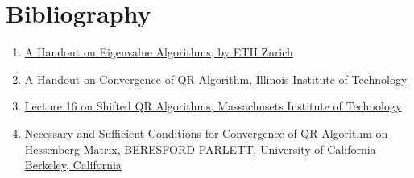 
\chapter{Bibliography} %

\label{Bibliography}


\begin{enumerate}
    \item \href{https://people.inf.ethz.ch/arbenz/ewp/Lnotes/chapter4.pdf}{A Handout on Eigenvalue Algorithms, by ETH Zurich}
    \item \href{https://www.math.iit.edu/~fass/477577_Chapter_11.pdf}{A Handout on Convergence of QR Algorithm, Illinois Institute of Technology}
    \item \href{https://dspace.mit.edu/bitstream/handle/1721.1/75282/18-335j-fall-2006/contents/lecture-notes/lec16.pdf}{Lecture 16 on Shifted QR Algorithms, Massachusets Institute of Technology}
    \item \href{https://dl.acm.org/doi/pdf/10.1145/800256.810675#:~:text=The%20QR%20Algorithm%20converges%20for%20an%20unreduced%20Hessenberg%20matrix%20if,and%20two%20o%2Fodd%20multiplicity.}{Necessary and Sufficient Conditions for Convergence of QR Algorithm on Hessenberg Matrix, BERESFORD PARLETT, University of California Berkeley, California}
\end{enumerate}